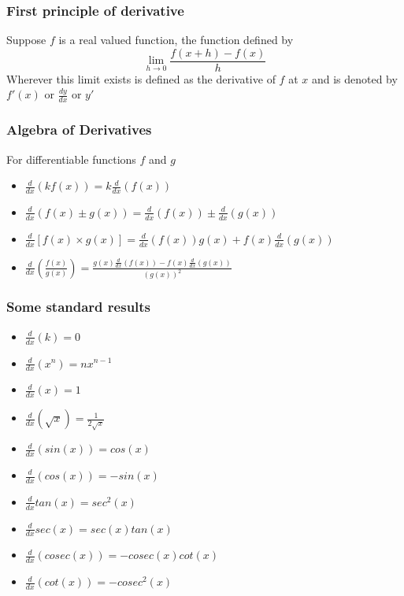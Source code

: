 \documentclass[12pt]{article}
\begin{document}
\subsubsection*{First principle of derivative}
Suppose $f$ is a real valued function, the function defined by 
$$\lim _{h \rightarrow 0} \frac{f(x+h)-f(x)}{h}$$
Wherever this limit exists is defined as the derivative of $f$ at $x$ and is denoted by $f'(x)$ or  $\frac{dy}{dx}$ or $y'$

\subsubsection*{Algebra of Derivatives}
For differentiable functions $f$ and $g$
\begin{itemize}
    \item $\frac{d}{dx}(k f(x))=k \frac{d}{dx}(f(x))$
    \item $\frac{d}{dx}(f(x) \pm g(x))= \frac{d}{dx}(f(x)) \pm \frac{d}{dx}(g(x))$
    \item $\frac{d}{dx}[f(x) \times g(x)]= \frac{d}{dx}(f(x)) g(x)+f(x) \frac{d}{dx}(g(x))$
    \item $\frac{d}{dx}(\frac{f(x)}{g(x)})=\frac{g(x)\frac{d}{dx}(f(x))-f(x) \frac{d}{dx}(g(x))}{(g(x))^2}$
    
\end{itemize}

\subsubsection*{Some standard results}
\begin{itemize}
    \item $\frac{d}{dx}(k)=0$
    \item $\frac{d}{dx}(x^n)=n x^{n-1}$
    \item $\frac{d}{dx}(x)=1$
    \item $\frac{d}{dx}(\sqrt{x})=\frac{1}{2 \sqrt{x}}$
    \item $\frac{d}{dx}(sin (x))=cos(x)$
    \item $\frac{d}{dx}(cos(x))=-sin(x)$
    \item $\frac{d}{dx}{tan (x)}= sec^2(x)$
    \item $\frac{d}{dx}{sec(x)}= sec(x)tan(x)$
    \item $\frac{d}{dx}(cosec(x))=-cosec(x)cot(x)$
    \item $\frac{d}{dx}(cot(x))=-cosec^2(x)$
\end{itemize}
\end{document}
